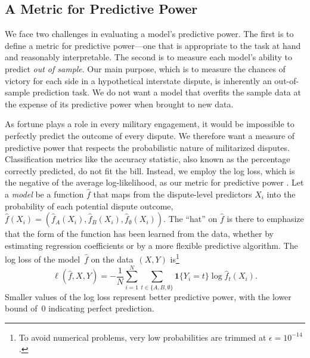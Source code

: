 \subsection{A Metric for Predictive Power}

We face two challenges in evaluating a model's predictive power.
The first is to define a metric for predictive power---one that is appropriate to the task at hand and reasonably interpretable.
The second is to measure each model's ability to predict \emph{out of sample}.
Our main purpose, which is to measure the chances of victory for each side in a hypothetical interstate dispute, is inherently an out-of-sample prediction task.
We do not want a model that overfits the sample data at the expense of its predictive power when brought to new data.

As fortune plays a role in every military engagement, it would be impossible to perfectly predict the outcome of every dispute.
We therefore want a measure of predictive power that respects the probabilistic nature of militarized disputes.
Classification metrics like the accuracy statistic, also known as the percentage correctly predicted, do not fit the bill.
Instead, we employ the log loss, which is the negative of the average log-likelihood, as our metric for predictive power \citep[221]{Hastie:2009wpa}.
Let a \emph{model} be a function $\hat{f}$ that maps from the dispute-level predictors $X_i$ into the probability of each potential dispute outcome, $\hat{f}(X_i) = (\hat{f}_A(X_i), \hat{f}_B(X_i), \hat{f}_{\emptyset}(X_i))$.
The ``hat'' on $\hat{f}$ is there to emphasize that the form of the function has been learned from the data, whether by estimating regression coefficients or by a more flexible predictive algorithm.
The log loss of the model~$\hat{f}$ on the data~$(X, Y)$ is\footnote{%
  To avoid numerical problems, very low probabilities are trimmed at $\epsilon = 10^{-14}$.
}
\begin{equation}
  \label{eq:log-loss}
  \ell(\hat{f}, X, Y)
  =
  - \frac{1}{N} \sum_{i = 1}^{N} \sum_{t \in \{A, B, \emptyset\}}
  \mathbf{1} \{Y_i = t\} \log \hat{f}_t(X_i).
\end{equation}
Smaller values of the log loss represent better predictive power, with the lower bound of~$0$ indicating perfect prediction.

